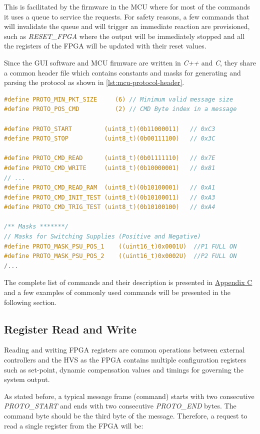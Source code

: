 This is facilitated by the firmware in the MCU where for most of the commands it
uses a queue to service the requests.
For safety reasons, a few commands that will invalidate the queue and will
trigger an immediate reaction are provisioned, such as \emph{RESET\_FPGA}
where the output will be immediately stopped and all the registers of the
FPGA will be updated with their reset values.

Since the GUI software and MCU firmware are written in \emph{C++} and \emph{C},
they share a common header file which contains constants and masks for
generating and parsing the protocol as shown in
\autoref{lst:mcu-protocol-header}.
\newpage
\begin{lstlisting}[language=C, style=commonstyle, caption={Messaging protocol
header file},
    label={lst:mcu-protocol-header}]
#define PROTO_MIN_PKT_SIZE     (6) // Minimum valid message size
#define PROTO_POS_CMD          (2) // CMD Byte index in a message

#define PROTO_START         (uint8_t)(0b11000011)   // 0xC3
#define PROTO_STOP          (uint8_t)(0b00111100)   // 0x3C

#define PROTO_CMD_READ      (uint8_t)(0b01111110)	// 0x7E
#define PROTO_CMD_WRITE     (uint8_t)(0b10000001)	// 0x81
// ...
#define PROTO_CMD_READ_RAM  (uint8_t)(0b10100001)	// 0xA1
#define PROTO_CMD_INIT_TEST (uint8_t)(0b10100011)	// 0xA3
#define PROTO_CMD_TRIG_TEST (uint8_t)(0b10100100)	// 0xA4

/** Masks *******/
// Masks for Switching Supplies (Positive and Negative)
#define PROTO_MASK_PSU_POS_1	((uint16_t)0x0001U)  //P1 FULL ON
#define PROTO_MASK_PSU_POS_2	((uint16_t)0x0002U)  //P2 FULL ON
/...

\end{lstlisting}


The complete list of commands and their description is
presented in \hyperref[sec:serial-protocol-commands]{Appendix C} and a few
examples of commonly used commands will be presented in the following section.

\subsection{Register Read and Write}
Reading and writing FPGA registers are common operations between
external controllers and the \acs{HVS} as the FPGA contains multiple
configuration registers such as set-point, dynamic
compensation values and timings for governing the system output.

As stated before, a typical message frame (command) starts with two consecutive
\emph{PROTO\_START} and ends with two consecutive \emph{PROTO\_END} bytes.
The command byte should be the third byte of the message.
Therefore, a request to read a single register from the FPGA will be:

